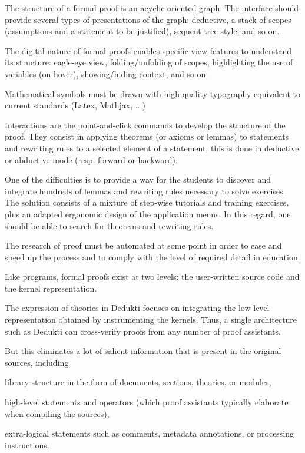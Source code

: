 The structure of a formal proof is an acyclic oriented graph.
The interface should provide several types of presentations of the graph:
deductive, a stack of scopes (assumptions and a statement to be justified),
sequent tree style, and so on.

The digital nature of formal proofs enables specific view features
to understand its structure: eagle-eye view, folding/unfolding of
scopes, highlighting the use of variables (on hover), showing/hiding
context, and so on.

Mathematical symbols must be drawn with high-quality typography equivalent
to current standards (Latex, Mathjax, ...)

Interactions are the point-and-click commands to develop the structure
of the proof. They consist in applying theorems (or axioms or lemmas)
to statements and rewriting rules to a selected element of a
statement; this is done in deductive or abductive mode (resp. forward
or backward).

One of the difficulties is to provide a way for the students to discover
and integrate hundreds of lemmas and rewriting rules necessary to solve
exercises. The solution consists of a mixture of step-wise tutorials and
training exercises, plus an adapted ergonomic design of the application menus.
In this regard, one should be able to search for theorems and rewriting rules.

The research of proof must be automated at some point in order to ease and
speed up the process and to comply with the level of required detail in education.


Like programs, formal proofs exist at two levels: the user-written
source code and the kernel representation.

The expression of theories in Dedukti focuses on integrating the low
level representation obtained by instrumenting the kernels.  Thus, a
single architecture such as Dedukti can cross-verify proofs from any
number of proof assistants.

But this eliminates a lot of salient information that is present in
the original sources, including
\begin{compactitem}
\item library structure in the form of documents, sections,
  theories, or modules,
\item high-level statements and operators (which proof assistants
  typically elaborate when compiling the sources),
\item extra-logical statements such as comments, metadata annotations,
  or processing instructions.
\end{compactitem}

